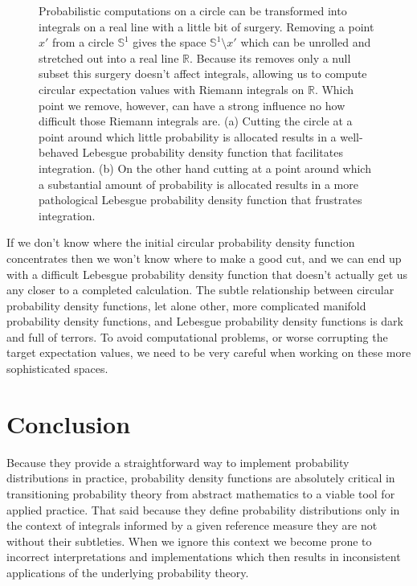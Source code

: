 \documentclass[
  letterpaper,
  DIV=11,
  numbers=noendperiod]{scrartcl}
\begin{document}
\begin{figure}
\begin{minipage}[t]{0.05\linewidth}
{}

\end{minipage}%

\caption{\label{fig-cutting-circles}Probabilistic computations on a
circle can be transformed into integrals on a real line with a little
bit of surgery. Removing a point \(x'\) from a circle \(\mathbb{S}^{1}\)
gives the space \(\mathbb{S}^{1} \setminus x'\) which can be unrolled
and stretched out into a real line \(\mathbb{R}\). Because its removes
only a null subset this surgery doesn't affect integrals, allowing us to
compute circular expectation values with Riemann integrals on
\(\mathbb{R}\). Which point we remove, however, can have a strong
influence no how difficult those Riemann integrals are. (a) Cutting the
circle at a point around which little probability is allocated results
in a well-behaved Lebesgue probability density function that facilitates
integration. (b) On the other hand cutting at a point around which a
substantial amount of probability is allocated results in a more
pathological Lebesgue probability density function that frustrates
integration.}

\end{figure}

If we don't know where the initial circular probability density function
concentrates then we won't know where to make a good cut, and we can end
up with a difficult Lebesgue probability density function that doesn't
actually get us any closer to a completed calculation. The subtle
relationship between circular probability density functions, let alone
other, more complicated manifold probability density functions, and
Lebesgue probability density functions is dark and full of terrors. To
avoid computational problems, or worse corrupting the target expectation
values, we need to be very careful when working on these more
sophisticated spaces.

\hypertarget{conclusion}{%
\section{Conclusion}\label{conclusion}}

Because they provide a straightforward way to implement probability
distributions in practice, probability density functions are absolutely
critical in transitioning probability theory from abstract mathematics
to a viable tool for applied practice. That said because they define
probability distributions only in the context of integrals informed by a
given reference measure they are not without their subtleties. When we
ignore this context we become prone to incorrect interpretations and
implementations which then results in inconsistent applications of the
underlying probability theory.
\end{document}

